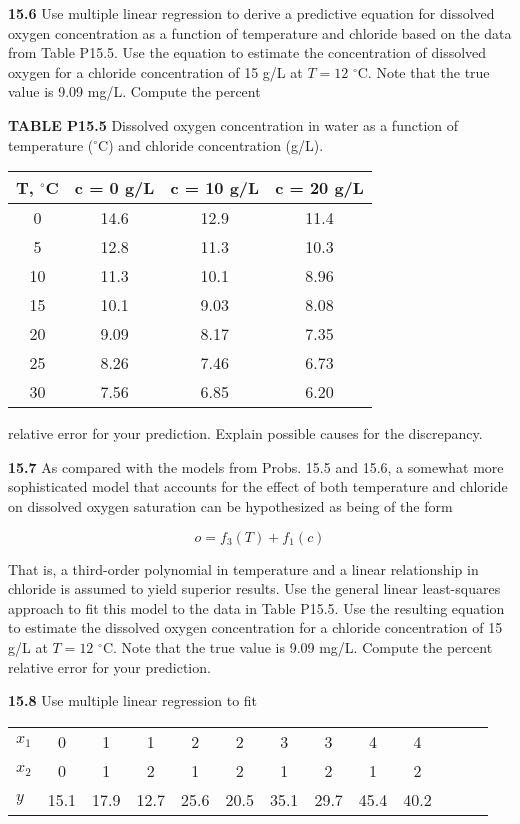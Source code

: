 \documentclass[../main.tex]{subfiles}
\begin{document}
\begin{multicols}{2}
	\noindent\textbf{15.6} Use multiple linear regression to derive a predictive
	equation for dissolved oxygen concentration as a function of
	temperature and chloride based on the data from Table P15.5.
	Use the equation to estimate the concentration of dissolved
	oxygen for a chloride concentration of 15 g/L at $T = 12$ $^\circ$C.
	Note that the true value is 9.09 mg/L. Compute the percent

	\noindent\textbf{TABLE P15.5} Dissolved oxygen concentration in water as a function of temperature ($^\circ$C) and chloride concentration (g/L).

	\noindent
	\begin{tabular}{c c c c}
		T, $^\circ$C & c = 0 g/L & c = 10 g/L & c = 20 g/L \\
		\hline
		0 & 14.6 & 12.9 & 11.4 \\
		5 & 12.8 & 11.3 & 10.3 \\
		10 & 11.3 & 10.1 & 8.96 \\
		15 & 10.1 & 9.03 & 8.08 \\
		20 & 9.09 & 8.17 & 7.35 \\
		25 & 8.26 & 7.46 & 6.73 \\
		30 & 7.56 & 6.85 & 6.20
	\end{tabular}

	\noindent relative error for your prediction. Explain possible causes for
	the discrepancy.

	\noindent\textbf{15.7} As compared with the models from Probs. 15.5 and
	15.6, a somewhat more sophisticated model that accounts
	for the effect of both temperature and chloride on dissolved oxygen saturation can be hypothesized as being of
	the form

	$$
		o = f_3 (T ) + f_1(c)
	$$

	\noindent That is, a third-order polynomial in temperature and a linear
	relationship in chloride is assumed to yield superior results.
	Use the general linear least-squares approach to fit this
	model to the data in Table P15.5. Use the resulting equation
	to estimate the dissolved oxygen concentration for a chloride
	concentration of 15 g/L at $T = 12$ $^\circ$C. Note that the true
	value is 9.09 mg/L. Compute the percent relative error for
	your prediction.

	\noindent\textbf{15.8} Use multiple linear regression to fit

	\noindent
	\begin{tabular}{l c c c c c c c c c c c c}
		\textbf{$x_1$} & 0 & 1 & 1 & 2 & 2 & 3 & 3 & 4 & 4 \\
		\textbf{$x_2$} & 0 & 1 & 2 & 1 & 2 & 1 & 2 & 1 & 2 \\
		\textbf{$y$} & 15.1 & 17.9 & 12.7 & 25.6 & 20.5 & 35.1 & 29.7 & 45.4 & 40.2
	\end{tabular}


\end{multicols}
\end{document}
